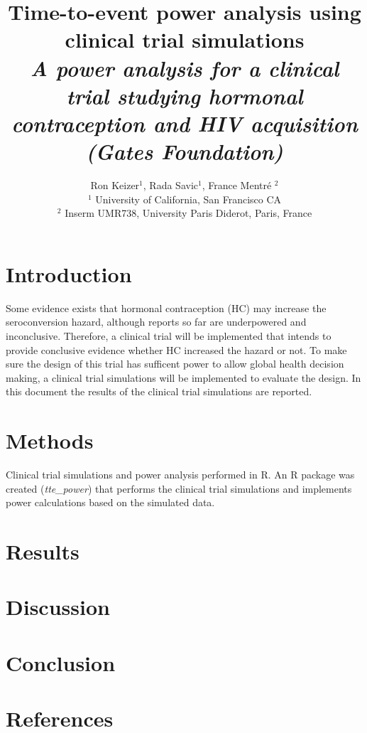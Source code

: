 \documentclass[11pt]{report}
\begin{document}
\title{Time-to-event power analysis using \\ clinical trial simulations \\
   \vspace{10pt}
  {\large \textit{A power analysis for a clinical trial studying hormonal contraception and HIV acquisition (Gates Foundation)}}
}
\author{Ron Keizer$^1$, Rada Savic$^1$, France Mentr\'e $^2$\\ 
{\small $^1$ University of California, San Francisco CA} \\
{\small $^2$ Inserm UMR738, University Paris Diderot, Paris, France}}

\maketitle


\section*{Introduction}
Some evidence exists that hormonal contraception (HC) may increase the seroconversion hazard, although reports so far are underpowered and inconclusive. Therefore, a clinical trial will be implemented that intends to provide conclusive evidence whether HC increased the hazard or not. To make sure the design of this trial has sufficent power to allow global health decision making, a clinical trial simulations will be implemented to evaluate the design. In this document the results of the clinical trial simulations are reported. 

\section*{Methods}
Clinical trial simulations and power analysis performed in R. An R package was created (\textit{tte\_power}) that performs the clinical trial simulations and implements power calculations based on the simulated data. 

\section*{Results}

\section*{Discussion}

\section*{Conclusion}

\section*{References}
\end{document}
